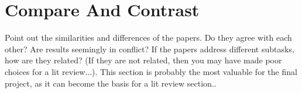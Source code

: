 \section{Compare And Contrast}
\label{sec:compareandcontrast}

Point out the similarities and differences of the papers. Do they agree with each other? Are results seemingly in conflict? If the papers address different subtasks, how are they related? (If they are not related, then you may have made poor choices for a lit review...). This section is probably the most valuable for the final project, as it can become the basis for a lit review section..
